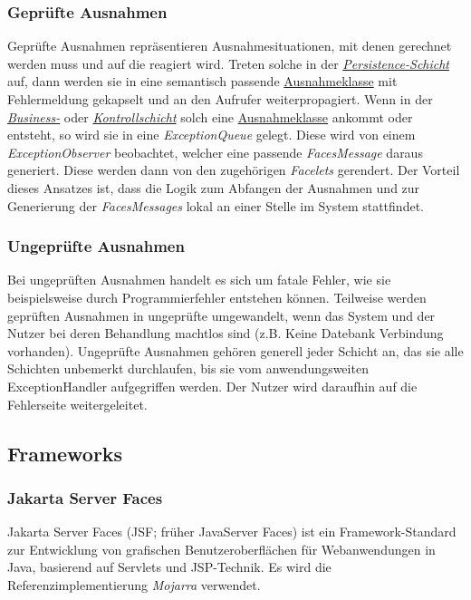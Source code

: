 \subsubsection{Geprüfte Ausnahmen}
Geprüfte Ausnahmen repräsentieren Ausnahmesituationen, mit
denen gerechnet werden muss und auf die reagiert wird.
Treten solche in der \emph{\hyperref[arch:persistence]{Persistence-Schicht}}
auf, dann werden sie in eine semantisch passende \hyperref[arch:busex]{Ausnahmeklasse}
mit Fehlermeldung gekapselt und an den Aufrufer weiterpropagiert.
Wenn in der \emph{\hyperref[arch:bus]{Business-}} oder
\emph{\hyperref[arch:control]{Kontrollschicht}} solch eine
\hyperref[arch:busex]{Ausnahmeklasse} ankommt oder entsteht, so
wird sie in eine \emph{ExceptionQueue} %
gelegt. Diese wird von einem \emph{ExceptionObserver} beobachtet, welcher eine passende
\emph{FacesMessage} daraus generiert.
Diese werden dann von den zugehörigen \emph{Facelets} %
gerendert.
Der Vorteil dieses Ansatzes ist, dass die Logik
zum Abfangen der Ausnahmen und zur Generierung der
\emph{FacesMessages} lokal an einer Stelle im System stattfindet.

\subsubsection{Ungeprüfte Ausnahmen}
Bei ungeprüften Ausnahmen handelt es sich um fatale Fehler, wie sie beispielsweise durch
Programmierfehler entstehen können. Teilweise werden geprüften Ausnahmen
in ungeprüfte umgewandelt, wenn das System und der Nutzer bei deren Behandlung
machtlos sind (z.B. Keine Datebank Verbindung vorhanden). %
Ungeprüfte Ausnahmen gehören generell jeder Schicht an, das sie alle Schichten unbemerkt durchlaufen,
bis sie vom anwendungsweiten
ExceptionHandler %
aufgegriffen werden. Der Nutzer wird daraufhin auf die Fehlerseite %
weitergeleitet.

\subsection{Frameworks}\label{arch:frameworks}

\subsubsection{Jakarta Server Faces}
Jakarta Server Faces (JSF; früher JavaServer Faces) ist ein Framework-Standard zur
Entwicklung von grafischen Benutzeroberflächen für Webanwendungen in Java, basierend auf Servlets und JSP-Technik.
Es wird die Referenzimplementierung \emph{Mojarra} verwendet.

